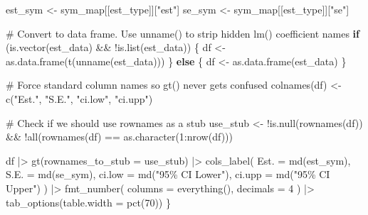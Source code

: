 \documentclass[
  letterpaper,
  DIV=11,
  numbers=noendperiod]{scrreprt}
\newenvironment{Shaded}{\begin{snugshade}}{\end{snugshade}}
\newcommand{\AttributeTok}[1]{\textcolor[rgb]{0.40,0.45,0.13}{#1}}
\newcommand{\CommentTok}[1]{\textcolor[rgb]{0.37,0.37,0.37}{#1}}
\newcommand{\ControlFlowTok}[1]{\textcolor[rgb]{0.00,0.23,0.31}{\textbf{#1}}}
\newcommand{\DecValTok}[1]{\textcolor[rgb]{0.68,0.00,0.00}{#1}}
\newcommand{\FunctionTok}[1]{\textcolor[rgb]{0.28,0.35,0.67}{#1}}
\newcommand{\NormalTok}[1]{\textcolor[rgb]{0.00,0.23,0.31}{#1}}
\newcommand{\OtherTok}[1]{\textcolor[rgb]{0.00,0.23,0.31}{#1}}
\newcommand{\SpecialCharTok}[1]{\textcolor[rgb]{0.37,0.37,0.37}{#1}}
\newcommand{\StringTok}[1]{\textcolor[rgb]{0.13,0.47,0.30}{#1}}
\renewcommand{\[}{\begin{equation}}
\renewcommand{\]}{\end{equation}}
\begin{document}
\begin{Shaded}
\begin{Highlighting}[]
\NormalTok{  est\_sym }\OtherTok{\textless{}{-}}\NormalTok{ sym\_map[[est\_type]][}\StringTok{"est"}\NormalTok{]}
\NormalTok{  se\_sym  }\OtherTok{\textless{}{-}}\NormalTok{ sym\_map[[est\_type]][}\StringTok{"se"}\NormalTok{]}

  \CommentTok{\# Convert to data frame. Use unname() to strip hidden lm() coefficient names}
  \ControlFlowTok{if}\NormalTok{ (}\FunctionTok{is.vector}\NormalTok{(est\_data) }\SpecialCharTok{\&\&} \SpecialCharTok{!}\FunctionTok{is.list}\NormalTok{(est\_data)) \{}
\NormalTok{    df }\OtherTok{\textless{}{-}} \FunctionTok{as.data.frame}\NormalTok{(}\FunctionTok{t}\NormalTok{(}\FunctionTok{unname}\NormalTok{(est\_data)))}
\NormalTok{  \} }\ControlFlowTok{else}\NormalTok{ \{}
\NormalTok{    df }\OtherTok{\textless{}{-}} \FunctionTok{as.data.frame}\NormalTok{(est\_data)}
\NormalTok{  \}}

  \CommentTok{\# Force standard column names so gt() never gets confused}
  \FunctionTok{colnames}\NormalTok{(df) }\OtherTok{\textless{}{-}} \FunctionTok{c}\NormalTok{(}\StringTok{"Est."}\NormalTok{, }\StringTok{"S.E."}\NormalTok{, }\StringTok{"ci.low"}\NormalTok{, }\StringTok{"ci.upp"}\NormalTok{)}

  \CommentTok{\# Check if we should use rownames as a stub}
\NormalTok{  use\_stub }\OtherTok{\textless{}{-}} \SpecialCharTok{!}\FunctionTok{is.null}\NormalTok{(}\FunctionTok{rownames}\NormalTok{(df)) }\SpecialCharTok{\&\&} \SpecialCharTok{!}\FunctionTok{all}\NormalTok{(}\FunctionTok{rownames}\NormalTok{(df) }\SpecialCharTok{==} \FunctionTok{as.character}\NormalTok{(}\DecValTok{1}\SpecialCharTok{:}\FunctionTok{nrow}\NormalTok{(df)))}

\NormalTok{  df }\SpecialCharTok{|\textgreater{}}
    \FunctionTok{gt}\NormalTok{(}\AttributeTok{rownames\_to\_stub =}\NormalTok{ use\_stub) }\SpecialCharTok{|\textgreater{}}
    \FunctionTok{cols\_label}\NormalTok{(}
      \AttributeTok{Est.   =} \FunctionTok{md}\NormalTok{(est\_sym),}
      \AttributeTok{S.E.   =} \FunctionTok{md}\NormalTok{(se\_sym),}
      \AttributeTok{ci.low =} \FunctionTok{md}\NormalTok{(}\StringTok{"95\% CI Lower"}\NormalTok{),}
      \AttributeTok{ci.upp =} \FunctionTok{md}\NormalTok{(}\StringTok{"95\% CI Upper"}\NormalTok{)}
\NormalTok{    ) }\SpecialCharTok{|\textgreater{}}
    \FunctionTok{fmt\_number}\NormalTok{(}
      \AttributeTok{columns =} \FunctionTok{everything}\NormalTok{(),}
      \AttributeTok{decimals =} \DecValTok{4}
\NormalTok{    ) }\SpecialCharTok{|\textgreater{}}
    \FunctionTok{tab\_options}\NormalTok{(}\AttributeTok{table.width =} \FunctionTok{pct}\NormalTok{(}\DecValTok{70}\NormalTok{))}
\NormalTok{\}}


\end{Highlighting}
\end{Shaded}
\end{document}
